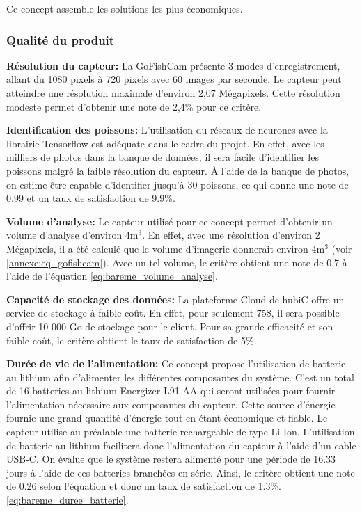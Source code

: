 Ce concept assemble les solutions les plus économiques.

\subsubsection{Qualité du produit}

\textbf{Résolution du capteur:} La GoFishCam présente 3 modes d'enregistrement, allant du 1080 pixels à 720 pixels avec 60 images par seconde. Le capteur peut atteindre une résolution maximale d'environ 2,07 Mégapixels. Cette résolution modeste permet d'obtenir une note de 2,4\% pour ce critère. \vspace{5mm}

\textbf{Identification des poissons:} L'utilisation du réseaux de neurones avec la librairie Tensorflow est adéquate dans le cadre du projet. En effet, avec les milliers de photos dans la banque de données, il sera facile d'identifier les poissons malgré la faible résolution du capteur. À l'aide de la banque de photos, on estime être capable d'identifier jusqu'à 30 poissons, ce qui donne une note de 0.99 et un taux de satisfaction de 9.9\%. \vspace{5mm}

\textbf{Volume d'analyse:} Le capteur utilisé pour ce concept permet d'obtenir un volume d'analyse d'environ 4m$^3$. En effet, avec une résolution d'environ 2 Mégapixels, il a été calculé que le volume d'imagerie donnerait environ 4m$^3$ (voir \ref{annexe:eq_gofishcam}). Avec un tel volume, le critère obtient une note de 0,7 à l'aide de l'équation \ref{eq:bareme_volume_analyse}.
\vspace{5mm}

\textbf{Capacité de stockage des données:} La plateforme Cloud de hubiC offre un service de stockage à faible coût. En effet, pour seulement 75\$, il sera possible d'offrir 10 000 Go de stockage pour le client. Pour sa grande efficacité et son faible coût, le critère obtient le taux de satisfaction de 5\%. \vspace{5mm}

\textbf{Durée de vie de l'alimentation:} Ce concept propose l'utilisation de batterie au lithium afin d'alimenter les différentes composantes du système. C'est un total de 16 batteries au lithium Energizer L91 AA qui seront utilisées pour fournir l'alimentation nécessaire aux composantes du capteur. Cette source d'énergie fournie une grand quantité d'énergie tout en étant économique et fiable. Le capteur utilise au préalable une batterie rechargeable de type Li-Ion. L'utilisation de batterie au lithium facilitera donc l'alimentation du capteur à l'aide d'un cable USB-C. On évalue que le système restera alimenté pour une période de 16.33 jours à l'aide de ces batteries branchées en série. Ainsi, le critère obtient une note de 0.26 selon l'équation et donc un taux de satisfaction de 1.3\%. \ref{eq:bareme_duree_batterie}.
\vspace{5mm}

